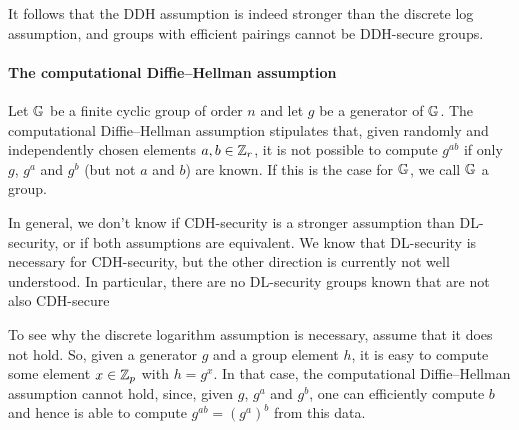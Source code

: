 It follows that the DDH assumption is indeed stronger than the discrete log assumption, and groups with efficient pairings cannot be DDH-secure groups. %

\begin{comment}
\begin{example}

Let $p$ be a prime number and $\F_p^*=\{1,2,\ldots,p-1\}$ the multiplicative group of modular $p$ arithmetics as in exercise \ref{ex:Zn*}. To see that $\F_p^*$ cannot be a DDH-secure group, recall from XXX that the \uterm{Legendre symbol} $\legsym{x}{p}$ of any $x\in \F_p^*$ is efficiently computable by \uterm{Euler's formular}.\sme{These are only explained later in the text, `\ref{eq: Legendre-symbol}`} But the  Legendre symbol of $g^{a}$ reveals whether $a$ is even or odd. Given $g^{a}$, $g^{b}$ and $g^{ab}$, one can thus efficiently compute and compare the least significant bit of $a$, $b$ and $a b$, respectively, which provides a probabilistic method to distinguish $g^{ab}$ from a random group element $g^c$.

\end{example}
\end{comment}

\paragraph{The computational  Diffie--Hellman assumption}
%
Let $\mathbb{G}$ be a finite cyclic group of order $n$ and let $g$ be a generator of $\mathbb{G}$. The computational Diffie--Hellman assumption stipulates that, given randomly and independently  chosen elements $a,b\in\mathbb{Z}_r$, it is not possible to compute $g^{ab}$ if only $g$, $g^a$ and $g^b$ (but not $a$ and $b$) are known. If this is the case for $\mathbb{G}$, we call $\mathbb{G}$ a  group.

In general, we don't know if CDH-security is a stronger assumption than DL-security, or if both assumptions are equivalent. We know that DL-security is necessary for CDH-security, but the other direction is currently not well understood. In particular, there are no DL-security groups known that are not also CDH-secure %

To see why the discrete logarithm assumption is necessary, assume that it does not hold. So, given a generator $g$ and a group element $h$, it is easy to compute some element $x\in\mathbb{Z}_p$ with $h=g^x$. In that case, the computational Diffie--Hellman assumption cannot hold, since, given $g$, $g^a$ and $g^b$, one can efficiently compute $b$ and hence is able to compute $g^{ab}=(g^a)^b$ from this data.

